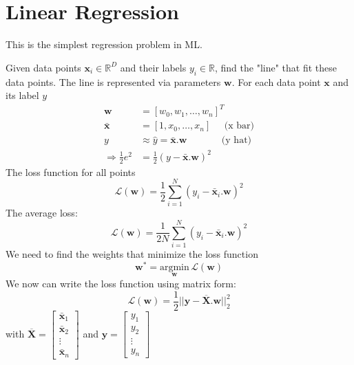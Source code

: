 \chapter{Linear Regression}

This is the simplest regression problem in \ac{ML}.

 Given data points $\textbf{x}_i \in \mathbb{R}^D$ and their labels $y_i \in \mathbb{R}$, find the "line" that fit these data points. The line is represented via parameters $\textbf{w}$. For each data point $\textbf{x}$ and its label $y$
\begin{align*}
	\textbf{w} &= [w_0, w_1, \dots, w_n]^T \\
	\bar{\textbf{x}} &= [1, x_0, \dots, x_n] \;\;\;\;\; \text{(x bar)}\\
	y &\approx \hat{y} = \bar{\textbf{x}} . \textbf{w} \;\;\;\;\;\;\;\;\;\;\;\;\; \text{(y hat)}\\
	\Rightarrow \frac{1}{2}e^2 &= \frac{1}{2} \left(y - \bar{\textbf{x}}.\textbf{w}\right)^2
\end{align*}
The loss function for all points
\begin{equation}
	\mathcal{L}(\textbf{w}) = \frac{1}{2} \sum_{i=1}^{N} \left(y_i - \bar{\textbf{x}}_i.\textbf{w}\right) ^2
\end{equation}
The average loss:
\begin{equation}
	\mathcal{L}(\textbf{w}) = \frac{1}{2N} \sum_{i=1}^{N} \left(y_i - \bar{\textbf{x}}_i.\textbf{w}\right) ^2
\end{equation}
We need to find the weights that minimize the loss function
\begin{equation}
	\textbf{w}^* = \underset{\textbf{w}}{\text{argmin}}\,\mathcal{L}(\textbf{w})
\end{equation}
We now can write the loss function using matrix form:
\begin{equation}
	\mathcal{L}(\textbf{w}) = \frac{1}{2} ||\textbf{y}-\overline{\textbf{X}}.\textbf{w}||^2_2
\end{equation}
with $\overline{\textbf{X}} = \begin{bmatrix}
	\bar{\textbf{x}}_1 \\
	\bar{\textbf{x}}_2 \\
	\vdots \\
	\bar{\textbf{x}}_n
\end{bmatrix}$
and $\textbf{y} = \begin{bmatrix}
	y_1 \\
	y_2 \\
	\vdots \\
	y_n	
\end{bmatrix}$

